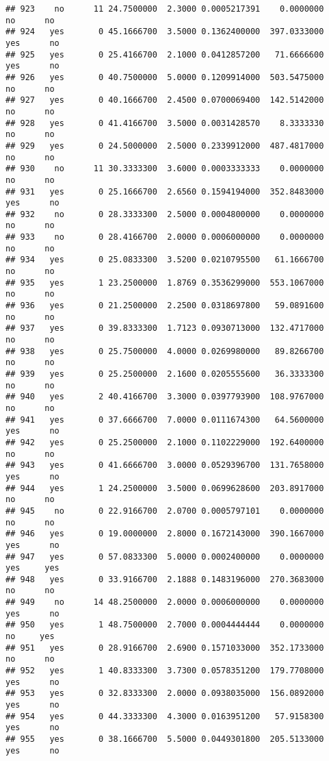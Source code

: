 \documentclass[]{article}
\begin{document}
\begin{verbatim}
## 923    no      11 24.7500000  2.3000 0.0005217391    0.0000000    no      no
## 924   yes       0 45.1666700  3.5000 0.1362400000  397.0333000   yes      no
## 925   yes       0 25.4166700  2.1000 0.0412857200   71.6666600   yes      no
## 926   yes       0 40.7500000  5.0000 0.1209914000  503.5475000    no      no
## 927   yes       0 40.1666700  2.4500 0.0700069400  142.5142000    no      no
## 928   yes       0 41.4166700  3.5000 0.0031428570    8.3333330    no      no
## 929   yes       0 24.5000000  2.5000 0.2339912000  487.4817000    no      no
## 930    no      11 30.3333300  3.6000 0.0003333333    0.0000000    no      no
## 931   yes       0 25.1666700  2.6560 0.1594194000  352.8483000   yes      no
## 932    no       0 28.3333300  2.5000 0.0004800000    0.0000000    no      no
## 933    no       0 28.4166700  2.0000 0.0006000000    0.0000000    no      no
## 934   yes       0 25.0833300  3.5200 0.0210795500   61.1666700    no      no
## 935   yes       1 23.2500000  1.8769 0.3536299000  553.1067000    no      no
## 936   yes       0 21.2500000  2.2500 0.0318697800   59.0891600    no      no
## 937   yes       0 39.8333300  1.7123 0.0930713000  132.4717000    no      no
## 938   yes       0 25.7500000  4.0000 0.0269980000   89.8266700    no      no
## 939   yes       0 25.2500000  2.1600 0.0205555600   36.3333300    no      no
## 940   yes       2 40.4166700  3.3000 0.0397793900  108.9767000    no      no
## 941   yes       0 37.6666700  7.0000 0.0111674300   64.5600000   yes      no
## 942   yes       0 25.2500000  2.1000 0.1102229000  192.6400000    no      no
## 943   yes       0 41.6666700  3.0000 0.0529396700  131.7658000   yes      no
## 944   yes       1 24.2500000  3.5000 0.0699628600  203.8917000    no      no
## 945    no       0 22.9166700  2.0700 0.0005797101    0.0000000    no      no
## 946   yes       0 19.0000000  2.8000 0.1672143000  390.1667000   yes      no
## 947   yes       0 57.0833300  5.0000 0.0002400000    0.0000000   yes     yes
## 948   yes       0 33.9166700  2.1888 0.1483196000  270.3683000    no      no
## 949    no      14 48.2500000  2.0000 0.0006000000    0.0000000   yes      no
## 950   yes       1 48.7500000  2.7000 0.0004444444    0.0000000    no     yes
## 951   yes       0 28.9166700  2.6900 0.1571033000  352.1733000    no      no
## 952   yes       1 40.8333300  3.7300 0.0578351200  179.7708000   yes      no
## 953   yes       0 32.8333300  2.0000 0.0938035000  156.0892000   yes      no
## 954   yes       0 44.3333300  4.3000 0.0163951200   57.9158300   yes      no
## 955   yes       0 38.1666700  5.5000 0.0449301800  205.5133000   yes      no

\end{verbatim}
\end{document}
